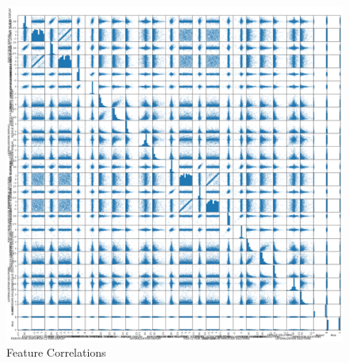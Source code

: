 \documentclass[extendedabs]{recpad2k}
\begin{document}


\appendix
\begin{figure}[h]
    \centering
    \includegraphics[width=2\linewidth]{featurecorrelation.png}
    \caption{Feature Correlations}
    \label{fig:feature}
\end{figure}




% 
\end{document}
